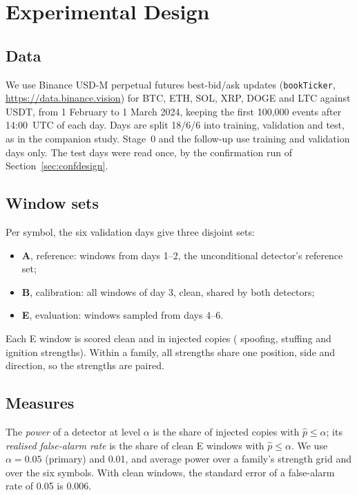 \documentclass[journal]{IEEEtran}
\begin{document}
\section{Experimental Design}
\label{sec:design}

\subsection{Data}
We use Binance USD-M perpetual futures best-bid/ask updates (\texttt{bookTicker},
\url{https://data.binance.vision}) for BTC, ETH, SOL, XRP, DOGE and LTC against USDT, from 1 February to 1 March
2024, keeping the first 100{,}000 events after 14:00~UTC of each day. Days are split 18/6/6 into training,
validation and test, as in the companion study. Stage~0 and the follow-up use training and validation days only.
The test days were read once, by the confirmation run of Section~\ref{sec:confdesign}.

\subsection{Window sets}
Per symbol, the six validation days give three disjoint sets:
\begin{itemize}
\item \textbf{A}, reference: \nRef{} windows from days 1--2, the unconditional detector's reference set;
\item \textbf{B}, calibration: all \nCal{} windows of day 3, clean, shared by both detectors;
\item \textbf{E}, evaluation: \nEval{} windows sampled from days 4--6.
\end{itemize}
Each E window is scored clean and in \nVariants{} injected copies (\nGridSpoof{} spoofing, \nGridStuff{} stuffing
and \nGridIgnit{} ignition strengths). Within a family, all strengths share one position, side and direction, so
the strengths are paired.

\subsection{Measures}
The \emph{power} of a detector at level $\alpha$ is the share of injected copies with $\hat p\le\alpha$; its
\emph{realised false-alarm rate} is the share of clean E windows with $\hat p\le\alpha$. We use $\alpha=0.05$
(primary) and 0.01, and average power over a family's strength grid and over the six symbols. With
\nEval{} clean windows, the standard error of a false-alarm rate of 0.05 is 0.006.
\end{document}
